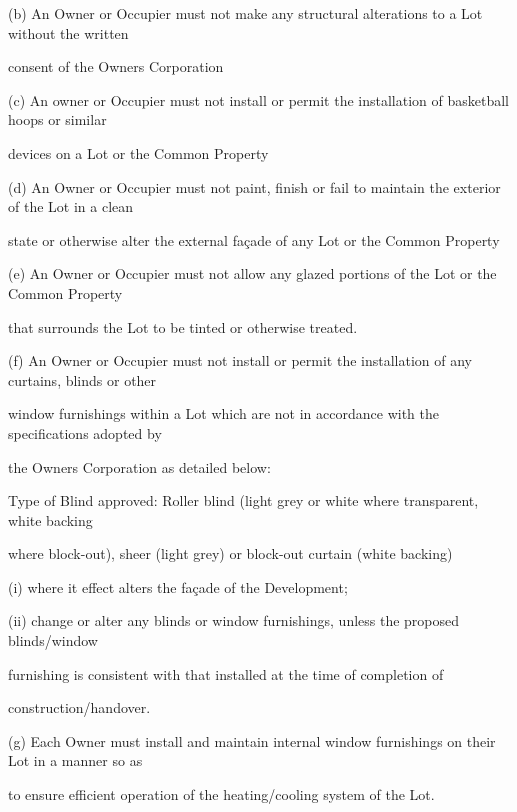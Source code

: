 \documentclass{article}
\begin{document}
{\fontsize{9.962}{1}(b) An Owner or Occupier must not make any structural alterations to a Lot without the written }

{\fontsize{10.02}{1}consent of the Owners Corporation }

{\fontsize{9.962}{1}(c) An owner or Occupier must not install or permit the installation of basketball hoops or similar }

{\fontsize{10.02}{1}devices on a Lot or the Common Property }

\newpage

{\fontsize{9.962}{1}(d) An Owner or Occupier must not paint, finish or fail to maintain the exterior of the Lot in a clean }

{\fontsize{10.02}{1}state or otherwise alter the external façade of any Lot or the Common Property }

{\fontsize{9.962}{1}(e) An Owner or Occupier must not allow any glazed portions of the Lot or the Common Property }

{\fontsize{10.02}{1}that surrounds the Lot to be tinted or otherwise treated. }

{\fontsize{9.962}{1}(f) An Owner or Occupier must not install or permit the installation of any curtains, blinds or other }

{\fontsize{10.02}{1}window furnishings within a Lot which are not in accordance with the specifications adopted by }

{\fontsize{10.02}{1}the Owners Corporation as detailed below: }

{\fontsize{10.02}{1}Type of Blind approved: Roller blind (light grey or white where transparent, white backing }

{\fontsize{10.02}{1}where block-out), sheer (light grey) or block-out curtain (white backing)  }

{\fontsize{9.962}{1}(i) where it effect alters the façade of the Development; }

{\fontsize{9.962}{1}(ii) change or alter any blinds or window furnishings, unless the proposed blinds/window }

{\fontsize{10.02}{1}furnishing is consistent with that installed at the time of completion of }

{\fontsize{10.02}{1}construction/handover. }

{\fontsize{9.962}{1}(g) Each Owner must install and maintain internal window furnishings on their Lot in a manner so as }

{\fontsize{10.02}{1}to ensure efficient operation of the heating/cooling system of the Lot. }
\end{document}
